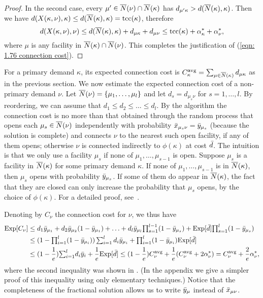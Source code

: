 \documentclass[11pt]{article}
\begin{document}
\begin{proof}
 In the second case, every $\mu'\in
{\overline{N}}(\nu)\cap {\overline{N}}(\kappa)$ has $d_{\mu'\kappa} >
d({\overline{N}}(\kappa),\kappa)$. Then we have
$d(X(\kappa,\nu),\kappa)\leq
d({\overline{N}}(\kappa),\kappa)=\textrm{tcc}(\kappa)$, therefore
\begin{equation*}
  d(X(\kappa,\nu), \nu) \leq d({\overline{N}}(\kappa), \kappa) +
  d_{\mu\kappa} + d_{\mu\nu} \leq \textrm{tcc}(\kappa) +
  \alpha_{\kappa}^\ast + \alpha_{\nu}^\ast,  
\end{equation*}
where $\mu$ is any facility in ${\overline{N}}(\kappa)\cap {\overline{N}}(\nu)$.
This completes the justification of (\ref{eqn: 1.76
  connection cost}).
\end{proof}

For a primary demand $\kappa$, its expected connection cost
is $C^{\mbox{\scriptsize\rm avg}}_{\kappa} = \sum_{\mu\in{\overline{N}}(\kappa)} d_{\mu\kappa}$
as in the previous section. We now estimate the expected
connection cost of a non-primary demand $\nu$. Let
${\overline{N}}(\nu) = { \left\{ \mu_1,\ldots,\mu_l \right\} }$ and let $d_s =
d_{\mu_s\nu}$ for $s = 1,\ldots,l$. By reordering, we can
assume that $d_1 \le d_2 \le \ldots \le d_l$. By the
algorithm the connection cost is no more than that obtained
through the random process that opens each $\mu_s\in
{\overline{N}}(\nu)$ independently with probability ${\bar x}_{\mu_s
  \nu} ={\bar y}_{\mu_s}$ (because the solution is complete)
and connects $\nu$ to the nearest such open facility, if any
of them opens; otherwise $\nu$ is connected indirectly to
$\phi(\kappa)$ at cost ${\bar d}$. The intuition is that we
only use a facility $\mu_s$ if none of
$\mu_1,\ldots,\mu_{s-1}$ is open. Suppose $\mu_s$ is a
facility in ${\overline{N}}(\kappa)$ for some primary demand
$\kappa$. If none of $\mu_1,\ldots,\mu_{s-1}$ is in
${\overline{N}}(\kappa)$, then $\mu_s$ opens with probability
${\bar y}_{\mu_s}$. If some of them do appear in
${\overline{N}}(\kappa)$, the fact that they are closed can only
increase the probability that $\mu_s$ opens, by the choice
of $\phi(\kappa)$.  For a detailed proof,
see~\cite{ChudakS04}.

Denoting by $C_\nu$ the connection cost for $\nu$, we thus have
%
\begin{align*}
  \mbox{\rm Exp}[C_\nu] &\leq d_1 {\bar y}_{\mu_1} + d_2 {\bar y}_{\mu_2}(1-{\bar y}_{\mu_1}) + \ldots
 		+  d_l {\bar y}_{\mu_l}\textstyle{\prod_{s=1}^{l-1}}(1-{\bar y}_{\mu_s}) 
		+  \mbox{\rm Exp}[{\bar d}]\textstyle{\prod_{s=1}^{l}} (1-{\bar y}_{\mu_s})
		\\
  &\leq (1-\textstyle{\prod_{i=1}^l} (1-{\bar y}_{\mu_i}))
  	\sum_{i=1}^l d_i{\bar y}_{\mu_i} + {\textstyle\prod_{i=1}^l} (1-\bar  y_{\mu_i})\mbox{\rm Exp}[{\bar d}]
	\\
  &\leq (1-\frac{1}{e}) {\textstyle\sum_{i=1}^l} d_i{\bar y}_i 
	+ \frac{1}{e} \mbox{\rm Exp}[{\bar d}] \leq (1-\frac{1}{e}) C^{{\mbox{\scriptsize\rm avg}}}_{\nu} 
	+	\frac{1}{e}	(C^{{\mbox{\scriptsize\rm avg}}}_{\nu} + 2\alpha_{\nu}^\ast) = C^{{\mbox{\scriptsize\rm avg}}}_{\nu} + \frac{2}{e}\alpha_{\nu}^\ast,
\end{align*}
%
where the second inequality was shown in
\cite{ChudakS04}. (In the appendix we give a simpler
proof of this inequality using only elementary techniques.)  Notice that the
completeness of the fractional solution allows us to write
${\bar y}_{\mu}$ instead of ${\bar x}_{\mu\nu}$.
\end{document}
